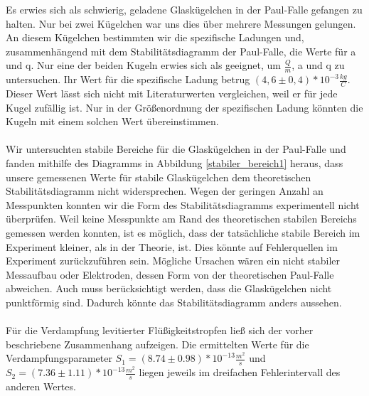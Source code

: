 \documentclass[10pt,a4paper]{article}
\begin{document}
Es erwies sich als schwierig, geladene Glaskügelchen in der Paul-Falle gefangen zu halten. Nur bei zwei Kügelchen war uns dies über mehrere Messungen gelungen. An diesem Kügelchen bestimmten wir die spezifische Ladungen und, zusammenhängend mit dem Stabilitätsdiagramm der Paul-Falle, die Werte für a und q.
Nur eine der beiden Kugeln erwies sich als geeignet, um $\frac{Q}{m}$, a und q zu untersuchen. Ihr Wert für die spezifische Ladung betrug $(4,6 \pm 0,4)*10^{-3} \frac{kg}{C}$. Dieser Wert lässt sich nicht mit Literaturwerten vergleichen, weil er für jede Kugel zufällig ist. Nur in der Größenordnung der spezifischen Ladung könnten die Kugeln mit einem solchen Wert übereinstimmen.\\\\Wir untersuchten stabile Bereiche für die Glaskügelchen in der Paul-Falle und fanden mithilfe des Diagramms in Abbildung \ref{stabiler_bereich1} heraus, dass unsere gemessenen Werte für stabile Glaskügelchen dem theoretischen Stabilitätsdiagramm nicht widersprechen. Wegen der geringen Anzahl an Messpunkten konnten wir die Form des Stabilitätsdiagramms experimentell nicht überprüfen. Weil keine Messpunkte am Rand des theoretischen stabilen Bereichs gemessen werden konnten, ist es möglich, dass der tatsächliche stabile Bereich im Experiment kleiner, als in der Theorie, ist. Dies könnte auf Fehlerquellen im Experiment zurückzuführen sein. Mögliche Ursachen wären ein nicht stabiler Messaufbau oder Elektroden, dessen Form von der theoretischen Paul-Falle abweichen. Auch muss berücksichtigt werden, dass die Glaskügelchen nicht punktförmig sind. Dadurch könnte das Stabilitätsdiagramm anders aussehen.\\\\Für die Verdampfung levitierter Flüßigkeitstropfen ließ sich der vorher beschriebene Zusammenhang aufzeigen. Die ermittelten Werte für die Verdampfungsparameter $S_{1} = (8.74 \pm 0.98) *10^{-13} \frac{m^{2}}{s}$ und $S_{2} = (7.36 \pm 1.11) *10^{-13} \frac{m^{2}}{s}$ liegen jeweils im dreifachen Fehlerintervall des anderen Wertes. 
\end{document}
